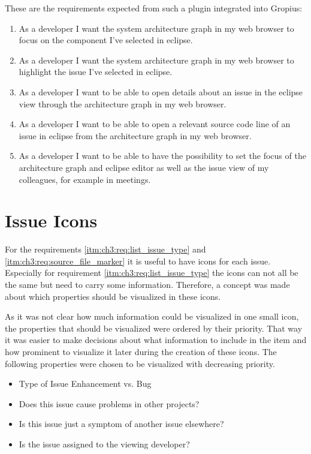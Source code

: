 These are the requirements expected from such a plugin integrated into Gropius:
\begin{enumerate}
	\setcounter{enumi}{\value{enumarteCounter}} %
	\item As a developer I want the system architecture graph in my web browser to focus on the component I've selected in eclipse.
	\item As a developer I want the system architecture graph in my web browser to highlight the issue I've selected in eclipse.
	\item As a developer I want to be able to open details about an issue in the eclipse view through the architecture graph in my web browser.
	\item As a developer I want to be able to open a relevant source code line of an issue in eclipse from the architecture graph in my web browser.
	\item As a developer I want to be able to have the possibility to set the focus of the architecture graph and eclipse editor as well as the issue view of my colleagues, for example in meetings.
\end{enumerate}

\section{Issue Icons}
\label{sec:ch3:s2}
For the requirements \ref{itm:ch3:req:list_issue_type} and \ref{itm:ch3:req:source_file_marker} it is useful to have icons for each issue.
Especially for requirement \ref{itm:ch3:req:list_issue_type} the icons can not all be the same but need to carry some information.
Therefore, a concept was made about which properties should be visualized in these icons.

As it was not clear how much information could be visualized in one small icon, 
the properties that should be visualized were ordered by their priority.
That way it was easier to make decisions about what information to include in the item and how prominent to visualize it later during the creation of these icons.
The following properties were chosen to be visualized with decreasing priority.
\begin{itemize}
	\item Type of Issue
	\subitem Enhancement vs. Bug
	\item Does this issue cause problems in other projects?
	\item Is this issue just a symptom of another issue elsewhere?
	\item Is the issue assigned to the viewing developer?
\end{itemize}

